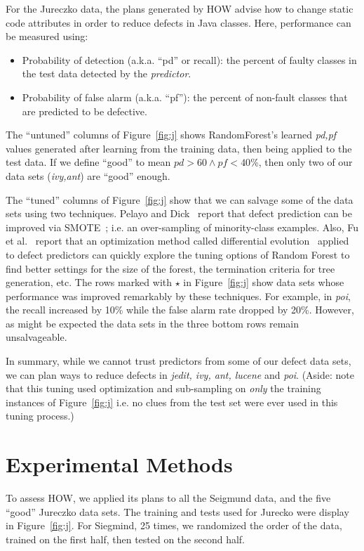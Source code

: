 \documentclass[conference]{IEEEtran}
\newcommand{\bi}{\begin{itemize}}
\newcommand{\ei}{\end{itemize}}
\newcommand{\fig}[1]{Figure~\ref{fig:#1}}
\begin{document}
For the  Jureczko   data,
the plans generated by HOW advise   how to change static code attributes in order to reduce defects in
Java classes.  Here,
performance can be measured using:
\bi
\item Probability of detection (a.k.a. ``pd'' or recall):  the percent of faulty classes in
the test data detected
by the {\em predictor}.
\item Probability of false alarm (a.k.a. ``pf''): the percent of non-fault
classes that are predicted to be defective.
\ei 
The ``untuned'' columns of \fig{j} shows RandomForest's learned {\em pd,pf}
values generated after learning from the training data, then being applied to the test data.
If we define ``good'' to mean $\mathit{pd}>60 \wedge \mathit{pf} < 40$\%,
then only two of our data sets ({\em ivy,ant}) are ``good'' enough. 

The ``tuned'' columns of \fig{j} show that we can salvage some of the data sets
using two techniques.
 Pelayo and Dick~\cite{pelayo07} report that defect prediction can be improved via SMOTE~\cite{Chawla2002}; i.e. an over-sampling of minority-class examples.
 Also, Fu et al.~\cite{fu:ase15} report that an optimization method called differential evolution~\cite{storn97}
applied to defect predictors can quickly explore the tuning
options of Random Forest to find better settings for the size of the forest, the termination criteria
for tree generation, etc.
The rows marked with $\star$ in \fig{j} show data sets whose performance was improved remarkably by these
techniques. For example, in {\em poi}, the recall increased by 10\% while the false alarm rate dropped by 20\%.
However,  as might be expected
the data sets in the  three bottom rows remain
unsalvageable.

In summary, while we cannot trust predictors from some of our defect data sets,
we can plan ways to reduce defects in {\em jedit, ivy, ant, lucene} and {\em poi}.
(Aside: note that this tuning used optimization and sub-sampling   on   {\em only} the
training instances of \fig{j}
i.e.
no clues from the test set were ever used in this tuning process.)


 

\section{Experimental Methods}

To assess HOW, we applied its plans to all the Seigmund data, and the five ``good''
  Jureczko   data sets.
  The training and tests used for Jurecko were display in \fig{j}. For Siegmind,
  25 times, 
  we randomized the order of the data, trained on the first half, then tested on the second half.
  
\end{document}
